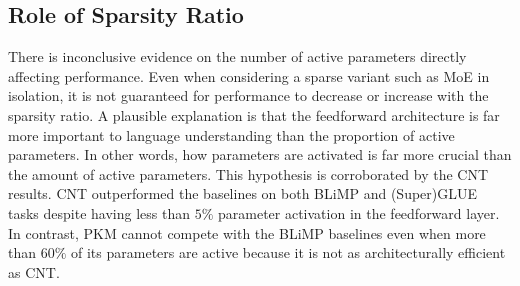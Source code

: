 \subsection{Role of Sparsity Ratio}
There is inconclusive evidence on the number of active parameters directly affecting performance. Even when considering a sparse variant such as MoE in isolation, it is not guaranteed for performance to decrease or increase with the sparsity ratio. A plausible explanation is that the feedforward architecture is far more important to language understanding than the proportion of active parameters. In other words, how parameters are activated is far more crucial than the amount of active parameters. This hypothesis is corroborated by the CNT results. CNT outperformed the baselines on both BLiMP and (Super)GLUE tasks despite having less than $5\%$ parameter activation in the feedforward layer. In contrast, PKM cannot compete with the BLiMP baselines even when more than $60\%$ of its parameters are active because it is not as architecturally efficient as CNT.
 


